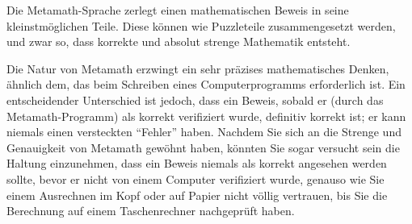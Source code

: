 Die Metamath-Sprache zerlegt einen mathematischen Beweis in seine kleinstmöglichen Teile. Diese können wie Puzzleteile zusammengesetzt werden, und zwar so, dass korrekte und absolut strenge Mathematik entsteht.

Die Natur von Metamath erzwingt ein sehr präzises mathematisches Denken, ähnlich dem, das beim Schreiben eines Computerprogramms erforderlich ist. Ein entscheidender Unterschied ist jedoch, dass ein Beweis, sobald er (durch das Metamath-Programm) als korrekt verifiziert wurde, definitiv korrekt ist; er kann niemals einen versteckten "`Fehler"' haben. Nachdem Sie sich an die Strenge und Genauigkeit von Metamath gewöhnt haben, könnten Sie sogar versucht sein die Haltung einzunehmen, dass ein Beweis niemals als korrekt angesehen werden sollte, bevor er nicht von einem Computer verifiziert wurde, genauso wie Sie einem Ausrechnen im Kopf oder auf Papier nicht völlig vertrauen, bis Sie die Berechnung auf einem Taschenrechner nachgeprüft haben.

